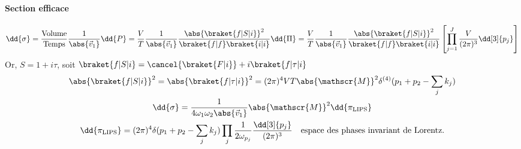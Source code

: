 \documentclass{article}
\begin{document}
\paragraph{Section efficace}
\begin{align*}
\dd{\sigma} = \frac{\text{Volume}}{\text{Temps}}\frac{1}{\abs{\vec{v}_1}} \dd{P}
= \frac{V}{T}\frac{1}{\abs{\vec{v}_1}} \frac{\abs{\braket{f|S|i}}^2}{\braket{f|f}\braket{i|i}}\dd{\Pi}
= \frac{V}{T}\frac{1}{\abs{\vec{v}_1}} \frac{\abs{\braket{f|S|i}}^2}{\braket{f|f}\braket{i|i}} \left[ \prod_{j=1}^J \frac{V}{(2\pi)^3} \dd[3]{p_j} \right]
\end{align*}
Or, $S = 1 + i\tau$, soit $\braket{f|S|i} = \cancel{\braket{F|i}} + i\braket{f|\tau|i}$
\begin{gather*}
\abs{\braket{f|S|i}}^2 = \abs{\braket{f|\tau|i}}^2 = (2\pi)^4 VT \abs{\mathscr{M}}^2 \delta^{(4)}(p_1+p_2-\sum_j k_j)\\
\dd{\sigma} = \frac{1}{4\omega_1\omega_2\abs{\vec{v}_1}} \abs{\mathscr{M}}^2 \dd{\pi_\text{LIPS}}\\
\dd{\pi_\text{LIPS}} = (2\pi)^4 \delta(p_1+p_2-\sum_jk_j)\prod_j \frac{1}{2\omega_{p_j}}\frac{\dd[3]{p_j}}{(2\pi)^3}\quad\text{espace des phases invariant de Lorentz.}
\end{gather*}

\end{document}
